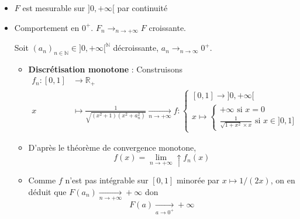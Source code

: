 \begin{myproof}{}{}
\begin{itemize}

  \item $F$ est mesurable sur $]0, +\infty[$ par continuité
  \item Comportement en $0 ^{+}$. $F_n \to _{n \to + \infty} F$ croissante. 

    Soit $(a_n) _{n \in \mathbb{N}} \in ]0, + \infty[ ^{\mathbb{N}}$ décroissante, $a_n \to _{n \to \infty} 0 ^{+}$. 

  \begin{itemize}


      \item \textbf{Discrétisation monotone} : Construisons 
        \begin{align}
          f_n : [0, 1] &\to \mathbb{R}_+ \\ 
          x &\mapsto \frac {1}{\sqrt{(x ^{2}+1 ) (x ^{2}+ a_n ^{2})}}  \underset{n \to +\infty}{\longrightarrow} f : \begin{cases}
            [0,1] \to ]0, + \infty[ \\ x \mapsto  \begin{cases}
            + \infty \text{ si } x = 0 \\ 
            \frac{1}{\sqrt{1 + x ^{2}} \times x} \text{ si } x \in ]0, 1]
          \end{cases}
          \end{cases}       
          \end{align}

      \item D'après le théorème de convergence monotone, 
        \begin{equation}
          f(x) = \underset{ n \to  + \infty}{\lim} \uparrow f_n(x)
        \end{equation}

      \item Comme $f$ n'est pas intégrable sur $[0,1]$ minorée par $x \mapsto 1/(2x)$, on en déduit que $F(a_n)  \underset{n \to + \infty}{\longrightarrow} + \infty$ don 
        \begin{equation}
          F(a)  \underset{a \to 0 ^{+}}{\longrightarrow}  + \infty
        \end{equation}
  \end{itemize}

\end{itemize}
\end{myproof}










